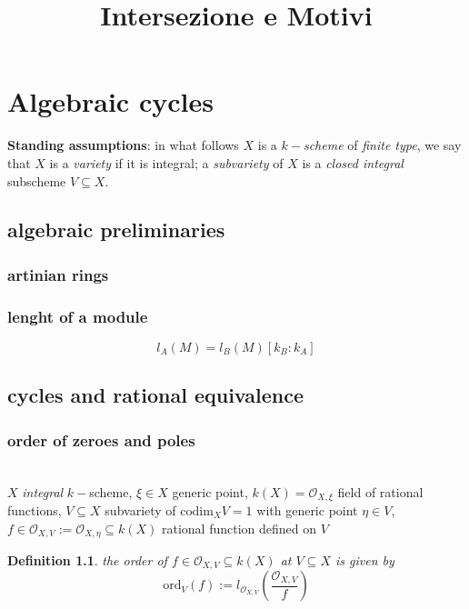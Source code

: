 \documentclass[oneside,a4paper,11pt]{amsbook}
\title{\normalsize\rmfamily Intersezione e Motivi}
\theoremstyle{pl}
\theoremstyle{df}
\newtheorem*{dfn}{Definition}
\theoremstyle{rm}
\newcommand{\nline}{
~\\
}%
\newcommand{\pa}[1]{
\left(#1\right)
}
\newcommand{\mc}[1]{
\mathcal{#1}
}
\newcommand{\ord}[2]{
\text{ord}_{#1}\pa{#2}
}
\newcommand{\cod}[2]{
\text{codim}_{#1}{#2}
}
\begin{document}
\maketitle

\tableofcontents

\chapter{Algebraic cycles}

\textbf{Standing assumptions}: in what follows $X$ is a \emph{$k-$scheme} of \emph{finite type}, we say that $X$ is a \emph{variety} if it is integral; a \emph{subvariety} of $X$ is a \emph{closed integral} subscheme $V\subseteq X$.

\section{algebraic preliminaries}
\subsection{artinian rings}
\subsection{lenght of a module}

\[
l_A(M)=l_B(M)[k_B:k_A]
\]

\section{cycles and rational equivalence} 

\subsection{order of zeroes and poles}
\nline
$X$ \emph{integral} $k-$scheme, $\xi\in X$ generic point, $k(X)=\mc{O}_{X,\xi}$ field of rational functions, $V\subseteq X$ subvariety of $\cod{X}{V}=1$ with generic point $\eta\in V$, $f\in\mc{O}_{X,V}:=\mc{O}_{X,\eta}\subseteq k(X)$ rational function defined on $V$

\begin{dfn}
the \emph{order} of $f\in\mc{O}_{X,V}\subseteq k(X)$ \emph{at} $V\subseteq X$ is given by
\[
\ord{V}{f}:=l_{\mc{O}_{X,V}}\pa{\frac{\mc{O}_{X,V}}{f}}
\]
\end{dfn}
\end{document}
